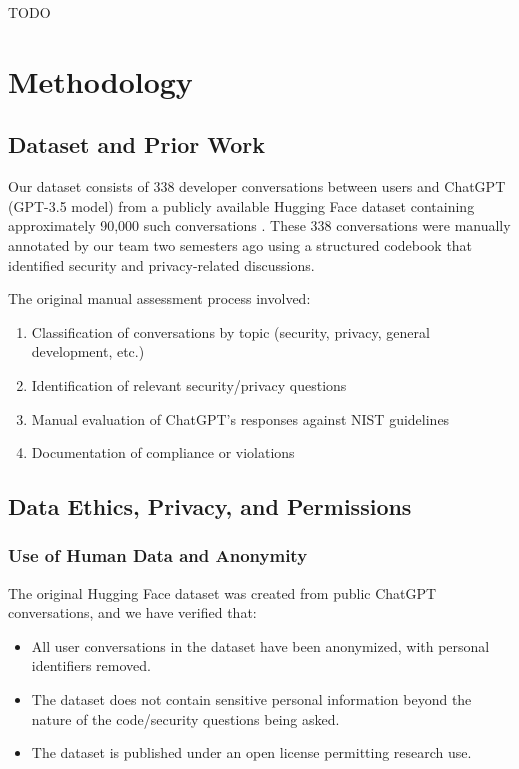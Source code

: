 \documentclass[12pt]{article}
\begin{document}
TODO
 
\section{Methodology}
 
\subsection{Dataset and Prior Work}
 
Our dataset consists of 338 developer conversations between users and ChatGPT (GPT-3.5 model) from a publicly available Hugging Face dataset containing approximately 90,000 such conversations \citep{huggingface2023}. These 338 conversations were manually annotated by our team two semesters ago using a structured codebook that identified security and privacy-related discussions.
 
The original manual assessment process involved:
\begin{enumerate}
    \item Classification of conversations by topic (security, privacy, general development, etc.)
    \item Identification of relevant security/privacy questions
    \item Manual evaluation of ChatGPT's responses against NIST guidelines
    \item Documentation of compliance or violations
\end{enumerate}
 
\subsection{Data Ethics, Privacy, and Permissions}
 
\subsubsection{Use of Human Data and Anonymity}
 
The original Hugging Face dataset was created from public ChatGPT conversations, and we have verified that:
\begin{itemize}
    \item All user conversations in the dataset have been anonymized, with personal identifiers removed.
    \item The dataset does not contain sensitive personal information beyond the nature of the code/security questions being asked.
    \item The dataset is published under an open license permitting research use.
\end{itemize}
 
\end{document}
